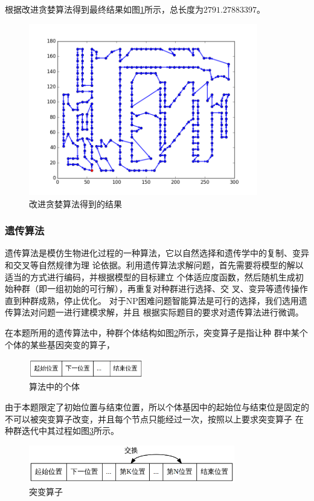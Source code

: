\documentclass[fontset=windows,a4paper,12pt]{ctexart}
\begin{document}
        根据改进贪婪算法得到最终结果如图\ref{fig:greedy}所示，总长度为$2791.27883397$。
		\begin{figure}[htbp]
			\centering
			\includegraphics[width=10cm]{pic/greedy_result.png}
			\caption{改进贪婪算法得到的结果}
			\label{fig:greedy}
		\end{figure}
      \subsubsection{遗传算法}
      
      遗传算法是模仿生物进化过程的一种算法，它以自然选择和遗传学中的复制、变异和交叉等自然规律为理
      论依据。利用遗传算法求解问题，首先需要将模型的解以适当的方式进行编码，并根据模型的目标建立
      个体适应度函数，然后随机生成初始种群（即一组初始的可行解），再重复对种群进行选择、交
      叉、变异等遗传操作直到种群成熟，停止优化\cite{赵静2008数学建模与数学实验}。
      对于NP困难问题智能算法是可行的选择，我们选用遗传算法对问题一进行建模求解，并且
      根据实际题目的要求对遗传算法进行微调。
      
      在本题所用的遗传算法中，种群个体结构如图\ref{fig:life}所示，突变算子是指让种
      群中某个个体的某些基因突变的算子，
      \begin{figure}[htbp]
      	\centering
      	\includegraphics[width=5cm]{pic/life_struct.png}
      	\caption{算法中的个体}
      	\label{fig:life}
      \end{figure}
      由于本题限定了初始位置与结束位置，所以个体基因中的起始位与结束位是固定的
      不可以被突变算子改变，并且每个节点只能经过一次，按照以上要求突变算子
      在种群迭代中其过程如图\ref{fig:muate}所示。
      \begin{figure}[!htbp]
      	\centering
      	\includegraphics[width=9cm]{pic/life_muate.png}
      	\caption{突变算子}
      	\label{fig:muate}
      \end{figure}
      
\end{document}

